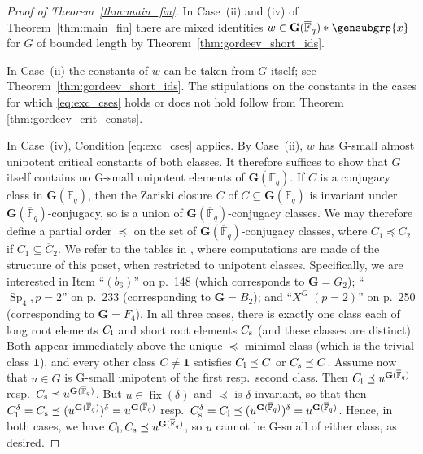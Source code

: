 \documentclass[a4paper,12pt]{amsproc}
\DeclareMathOperator{\Sp}{Sp}%
\DeclareMathOperator{\fix}{fix}%
\theoremstyle{plain}
\theoremstyle{definition}
\begin{document}
\begin{proof}[Proof of Theorem~\ref{thm:main_fin}]
In Case~(ii) and (iv) of Theorem~\ref{thm:main_fin} there are mixed identities $w\in\mathbf{G}(\overline{\mathbb{F}}_q)\ast\gensubgrp{x}$ for $G$ of bounded length by Theorem~\ref{thm:gordeev_short_ids}.

In Case~(ii) the constants of $w$ can be taken from $G$ itself; see Theorem~\ref{thm:gordeev_short_ids}.
The stipulations on the constants in the cases for which \eqref{eq:exc_cses} holds or does not hold follow from Theorem \ref{thm:gordeev_crit_consts}. 

In Case~(iv), Condition \eqref{eq:exc_cses} applies. By Case~(ii), $w$ has G-small almost unipotent critical constants of both classes. 
It therefore suffices to show that $G$ itself contains 
no G-small unipotent elements of $\mathbf{G}(\overline{\mathbb{F}}_q)$. 
If $C$ is a conjugacy class in $\mathbf{G}(\overline{\mathbb{F}}_q)$, 
then the Zariski closure $\overline{C}$ of $C\subseteq\mathbf{G}(\overline{\mathbb{F}}_q)$ 
is invariant under $\mathbf{G}(\overline{\mathbb{F}}_q)$-conjugacy, so is a union 
of $\mathbf{G}(\overline{\mathbb{F}}_q)$-conjugacy classes. 
We may therefore define a partial order $\preceq$ 
on the set of $\mathbf{G}(\overline{\mathbb{F}}_q)$-conjugacy classes, 
where $C_1\preceq C_2$ 
if $C_1\subseteq\overline{C}_2$. 
We refer to the tables in \cite{spaltenstein2006classes}, 
where computations are made of the structure 
of this poset, when restricted to unipotent classes. 
Specifically, we are interested in Item ``$(b_6)$'' 
on p.\ 148 (which corresponds to $\mathbf{G}=G_2$); 
``$\Sp_4,p=2$'' on p.\ 233 
(corresponding to $\mathbf{G}=B_2$); 
and ``$X^G \; (p=2)$'' on p.\ 250 
(corresponding to $\mathbf{G}=F_4$). 
In all three cases, there is exactly 
one class each of long root elements $C_{\rm l}$ 
and short root elements $C_{\rm s}$ 
(and these classes are distinct). 
Both appear immediately above the unique 
$\preceq$-minimal class (which is the trivial class $\mathbf{1}$), 
and every other class $C\neq\mathbf{1}$ satisfies $C_{\rm l}\preceq C$ or $C_{\rm s}\preceq C$. 
Assume now that $u\in G$ is G-small unipotent of the first resp.\ second class. Then $C_{\rm l}\preceq u^{\mathbf{G}(\overline{\mathbb{F}}_q)}$ resp.\  $C_{\rm s}\preceq u^{\mathbf{G}(\overline{\mathbb{F}}_q)}$.
But $u\in\fix(\delta)$ and $\preceq$ is $\delta$-invariant, so that then $C_{\rm l}^\delta=C_{\rm s}\preceq(u^{\mathbf{G}(\overline{\mathbb{F}}_q)})^\delta=u^{\mathbf{G}(\overline{\mathbb{F}}_q)}$ resp.\ $C_{\rm s}^\delta=C_{\rm l}\preceq(u^{\mathbf{G}(\overline{\mathbb{F}}_q)})^\delta=u^{\mathbf{G}(\overline{\mathbb{F}}_q)}$. Hence, in both cases, we have $C_{\rm l},C_{\rm s}\preceq u^{\mathbf{G}(\overline{\mathbb{F}}_q)}$, so $u$ cannot be G-small of either class, as desired.
\end{proof}
\end{document}
